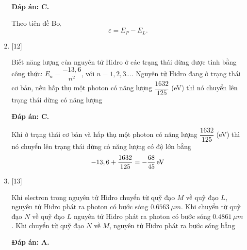 \begin{enumerate}[label=\bfseries Câu \arabic*:]
		\loigiai
		{		\textbf{Đáp án: C.}

Theo tiên đề Bo,
	\begin{equation}
		\varepsilon = E_{P} - E_{L}. 
	\end{equation}
		}
		
		\item {}
	
		\cauhoi
		{Biết năng lượng của nguyên tử Hidro ở các trạng thái dừng được tính bằng công thức: $ E_{n} = \dfrac{-13,6}{n^{2}} $, với $ n = 1,2,3... $. Nguyên tử Hidro đang ở trạng thái cơ bản, nếu hấp thụ một photon có năng lượng $ \dfrac{1632}{125} $ (eV) thì nó chuyển lên trạng thái dừng có năng lượng 
		}
	
		\loigiai
		{		\textbf{Đáp án: C.}

Khi ở trạng thái cơ bản và hấp thụ một photon có năng lượng $ \dfrac{1632}{125} $ (eV) thì nó chuyển lên trạng thái dừng có năng lượng có độ lớn bằng
	\begin{equation*}
		-13,6 + \dfrac{1632}{125} = \xsi{-\dfrac{68}{45}}{eV}
	\end{equation*}
		}

		\item {}
	
		\cauhoi
		{Khi electron trong nguyên tử Hidro chuyển từ quỹ đạo $ M $ về quỹ đạo $ L $, nguyên tử Hidro phát ra photon có bước sóng $ \SI{0,6563}{\mu m} $. Khi chuyển từ quỹ đạo $ N $ về quỹ đạo $ L $ nguyên tử Hidro phát ra photon có bước sóng $ \SI{0,4861}{\mu m} $. Khi chuyển từ quỹ đạo $ N $ về $ M $, nguyên tử Hidro phát ra bước sóng bằng
		}
	
		\loigiai
		{		\textbf{Đáp án: A.}

}
\end{enumerate}
